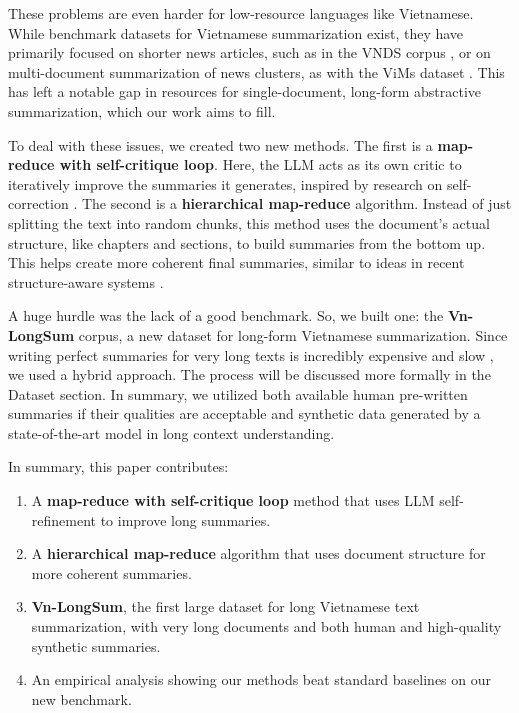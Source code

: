 \documentclass[11pt]{article}
\begin{document}
These problems are even harder for low-resource languages like Vietnamese. While benchmark datasets for Vietnamese summarization exist, they have primarily focused on shorter news articles, such as in the VNDS corpus \citep{nguyen2019vnds}, or on multi-document summarization of news clusters, as with the ViMs dataset \citep{tran2020vims}. This has left a notable gap in resources for single-document, long-form abstractive summarization, which our work aims to fill.

To deal with these issues, we created two new methods. The first is a \textbf{map-reduce with self-critique loop}. Here, the LLM acts as its own critic to iteratively improve the summaries it generates, inspired by research on self-correction \citep{kamoi2024llms, madaan2023selfrefine}. The second is a \textbf{hierarchical map-reduce} algorithm. Instead of just splitting the text into random chunks, this method uses the document's actual structure, like chapters and sections, to build summaries from the bottom up. This helps create more coherent final summaries, similar to ideas in recent structure-aware systems \citep{kim2025nexussum}.

A huge hurdle was the lack of a good benchmark. So, we built one: the \textbf{Vn-LongSum} corpus, a new dataset for long-form Vietnamese summarization. Since writing perfect summaries for very long texts is incredibly expensive and slow \citep{koh2022survey}, we used a hybrid approach. The process will be discussed more formally in the Dataset section. In summary, we utilized both available human pre-written summaries if their qualities are acceptable and synthetic data generated by a state-of-the-art model in long context understanding.

In summary, this paper contributes:
\begin{enumerate}
    \item A \textbf{map-reduce with self-critique loop} method that uses LLM self-refinement to improve long summaries.
    \item A \textbf{hierarchical map-reduce} algorithm that uses document structure for more coherent summaries.
    \item \textbf{Vn-LongSum}, the first large dataset for long Vietnamese text summarization, with very long documents and both human and high-quality synthetic summaries.
    \item An empirical analysis showing our methods beat standard baselines on our new benchmark.
\end{enumerate}
\end{document}
